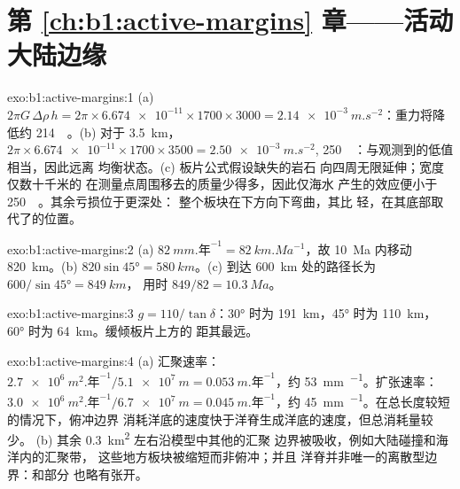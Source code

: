 \section*{第 \ref{ch:b1:active-margins} 章——活动大陆边缘}

\begin{solution}{exo:b1:active-margins:1}
(a) $2\pi G\,\Delta\rho\,h = 2\pi\times\num{6.674e-11}\times1700\times3000 =
\qty{2.14e-3}{m.s^{-2}}$：重力将降低约
\qty{214}{\milli\gal}。(b) 对于 \qty{3.5}{km}，
$2\pi\times\num{6.674e-11}\times1700\times3500 = \qty{2.50e-3}{m.s^{-2}}$,
\qty{250}{\milli\gal}：与观测到的低值相当，因此远离
均衡状态。(c) 板片公式假设缺失的岩石
向四周无限延伸；宽度仅数十千米的
在测量点周围移去的质量少得多，因此仅海水
产生的效应便小于 \qty{250}{\milli\gal}。其余亏损位于更深处：
整个板块在下方向下弯曲，其比
轻，在其底部取代了的位置。
\end{solution}

\begin{solution}{exo:b1:active-margins:2}
(a) $\qty{82}{mm.\text{年}^{-1}} = \qty{82}{km.Ma^{-1}}$，故
\qty{10}{Ma} 内移动 \qty{820}{km}。(b) $820\sin\ang{45} = \qty{580}{km}$。(c) 到达
\qty{600}{km} 处的路径长为 $600/\sin\ang{45} = \qty{849}{km}$，
用时 $849/82 = \qty{10.3}{Ma}$。
\end{solution}

\begin{solution}{exo:b1:active-margins:3}
$g = 110/\tan\delta$：\ang{30} 时为 \qty{191}{km}，\ang{45} 时为 \qty{110}{km}，
\ang{60} 时为 \qty{64}{km}。缓倾板片上方的
距其最远。
\end{solution}

\begin{solution}{exo:b1:active-margins:4}
(a) 汇聚速率：$\qty{2.7e6}{m^2.\text{年}^{-1}}/\qty{5.1e7}{m} =
\qty{0.053}{m.\text{年}^{-1}}$，约 \qty{53}{mm.^{-1}}。扩张速率：
$\qty{3.0e6}{m^2.\text{年}^{-1}}/\qty{6.7e7}{m} = \qty{0.045}{m.\text{年}^{-1}}$，约
\qty{45}{mm.^{-1}}。在总长度较短的情况下，俯冲边界
消耗洋底的速度快于洋脊生成洋底的速度，但总消耗量较少。
(b) 其余 \qty{0.3}{km^2} 左右沿模型中其他的汇聚
边界被吸收，例如大陆碰撞和海洋内的汇聚带，
这些地方板块被缩短而非俯冲；并且
洋脊并非唯一的离散型边界：和部分
也略有张开。
\end{solution}

